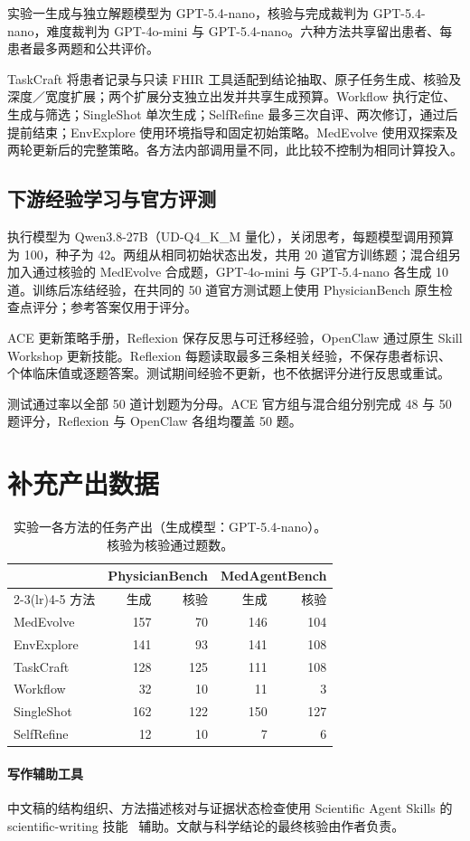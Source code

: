 实验一生成与独立解题模型为 GPT-5.4-nano，核验与完成裁判为 GPT-5.4-nano，难度裁判为 GPT-4o-mini 与 GPT-5.4-nano。六种方法共享留出患者、每患者最多两题和公共评价。

TaskCraft 将患者记录与只读 FHIR 工具适配到结论抽取、原子任务生成、核验及深度／宽度扩展；两个扩展分支独立出发并共享生成预算。Workflow 执行定位、生成与筛选；SingleShot 单次生成；SelfRefine 最多三次自评、两次修订，通过后提前结束；EnvExplore 使用环境指导和固定初始策略。MedEvolve 使用双探索及两轮更新后的完整策略。各方法内部调用量不同，此比较不控制为相同计算投入。

\subsection{下游经验学习与官方评测}
\label{app:exp2}

执行模型为 Qwen3.8-27B（UD-Q4\_K\_M 量化），关闭思考，每题模型调用预算为 100，种子为 42。两组从相同初始状态出发，共用 20 道官方训练题；混合组另加入通过核验的 MedEvolve 合成题，GPT-4o-mini 与 GPT-5.4-nano 各生成 10 道。训练后冻结经验，在共同的 50 道官方测试题上使用 PhysicianBench 原生检查点评分；参考答案仅用于评分。

ACE 更新策略手册，Reflexion 保存反思与可迁移经验，OpenClaw 通过原生 Skill Workshop 更新技能。Reflexion 每题读取最多三条相关经验，不保存患者标识、个体临床值或逐题答案。测试期间经验不更新，也不依据评分进行反思或重试。

测试通过率以全部 50 道计划题为分母。ACE 官方组与混合组分别完成 48 与 50 题评分，Reflexion 与 OpenClaw 各组均覆盖 50 题。

\section{补充产出数据}
\label{app:counts}

\begin{table}[!t]
\centering
\small
\caption{实验一各方法的任务产出（生成模型：GPT-5.4-nano）。核验为核验通过题数。}
\label{tab:counts}
\setlength{\tabcolsep}{2pt}
\renewcommand{\arraystretch}{1.12}
\begin{tabular*}{\columnwidth}{@{\extracolsep{\fill}}lrrrr@{}}
\toprule
 & \multicolumn{2}{c}{PhysicianBench} & \multicolumn{2}{c}{MedAgentBench} \\
\cmidrule(lr){2-3}\cmidrule(lr){4-5}
方法 & 生成 & 核验 & 生成 & 核验 \\
\midrule
MedEvolve & 157 & 70 & 146 & 104 \\
EnvExplore & 141 & 93 & 141 & 108 \\
TaskCraft & 128 & 125 & 111 & 108 \\
Workflow & 32 & 10 & 11 & 3 \\
SingleShot & 162 & 122 & 150 & 127 \\
SelfRefine & 12 & 10 & 7 & 6 \\
\bottomrule
\end{tabular*}
\end{table}

\paragraph{写作辅助工具}
中文稿的结构组织、方法描述核对与证据状态检查使用 Scientific Agent Skills 的 scientific-writing 技能~\citep{kassis2026skills} 辅助。文献与科学结论的最终核验由作者负责。


